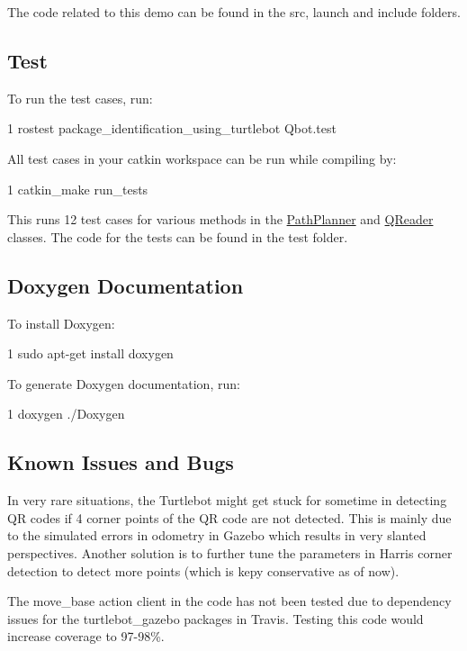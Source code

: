  

The code related to this demo can be found in the src, launch and include folders.

\subsection*{Test}

To run the test cases, run\+: 
\begin{DoxyCode}
1 rostest package\_identification\_using\_turtlebot Qbot.test
\end{DoxyCode}


All test cases in your catkin workspace can be run while compiling by\+: 
\begin{DoxyCode}
1 catkin\_make run\_tests
\end{DoxyCode}


This runs 12 test cases for various methods in the \hyperlink{classPathPlanner}{Path\+Planner} and \hyperlink{classQReader}{Q\+Reader} classes. The code for the tests can be found in the test folder.

\subsection*{Doxygen Documentation}

To install Doxygen\+: 
\begin{DoxyCode}
1 sudo apt-get install doxygen
\end{DoxyCode}
 To generate Doxygen documentation, run\+: 
\begin{DoxyCode}
1 doxygen ./Doxygen
\end{DoxyCode}


\subsection*{Known Issues and Bugs}


\begin{DoxyItemize}
\item In very rare situations, the Turtlebot might get stuck for sometime in detecting QR codes if 4 corner points of the QR code are not detected. This is mainly due to the simulated errors in odometry in Gazebo which results in very slanted perspectives. Another solution is to further tune the parameters in Harris corner detection to detect more points (which is kepy conservative as of now).
\item The move\+\_\+base action client in the code has not been tested due to dependency issues for the turtlebot\+\_\+gazebo packages in Travis. Testing this code would increase coverage to 97-\/98\%.
\end{DoxyItemize}

